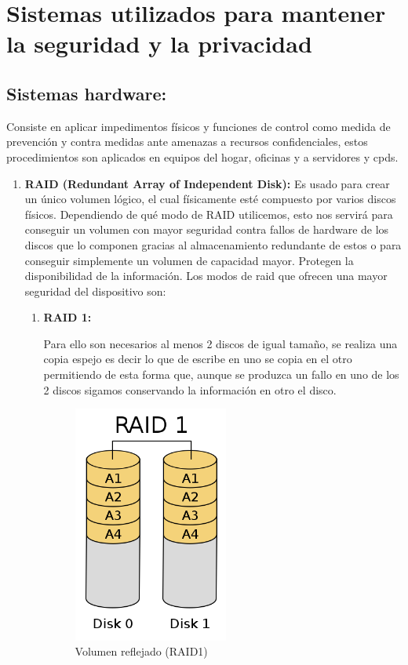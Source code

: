 \chapter{Sistemas utilizados para mantener la seguridad y la privacidad}
\label{cha:tipos-sistemas}
\cite{tiposseguridad}
\section{Sistemas hardware:}
Consiste en aplicar impedimentos físicos y funciones de control como medida de prevención y contra medidas ante amenazas a recursos confidenciales, estos procedimientos son aplicados en equipos del hogar, oficinas y a servidores y cpds.
\begin{enumerate}
\item {\bfseries RAID (Redundant Array of Independent Disk):}
Es usado para crear un único volumen lógico, el cual físicamente esté compuesto por varios discos físicos. Dependiendo de qué modo de RAID utilicemos, esto nos servirá para conseguir un volumen con mayor seguridad contra fallos de hardware de los discos que lo componen gracias al almacenamiento redundante de estos o para conseguir simplemente un volumen de capacidad mayor. Protegen la disponibilidad de la información.  Los modos de raid que ofrecen una mayor seguridad del dispositivo son:
\begin{enumerate}
\item {\bfseries RAID 1:}

Para ello son necesarios al menos 2 discos de igual tamaño, se realiza una copia espejo es decir lo que de escribe en uno se copia en el otro permitiendo de esta forma que, aunque se produzca un fallo en uno de los 2 discos sigamos conservando la información en otro el disco.

\begin{figure}[tphb]
  		   \centering
     		   \includegraphics[width=2in]{raid1.png}
  		   \caption{Volumen reflejado (RAID1) \cite{ddos}}
  		   \label{img:raid1}
\end{figure}


\end{enumerate}
\end{enumerate}
